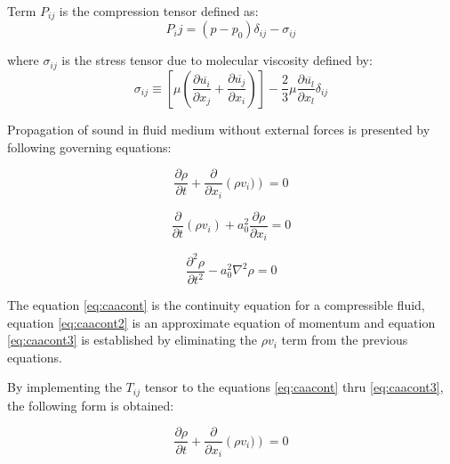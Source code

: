 Term $P_{ij}$ is the compression tensor defined as:
\begin{equation} \label{eq:Ptensor}
P_ij = (p - p_0)\delta_{ij} - \sigma_{ij}
\end{equation}

\noindent where $\sigma_{ij}$ is the stress tensor due to molecular viscosity defined by:
\begin{equation} \label{eq:viscstress}
\sigma_{ij}
\equiv
\left[ \mu \left( \frac{\partial \overline{u_i}}{\partial x_{j}} + \frac{\partial \overline{u_j}}{\partial x_{i}} \right) \right]
- \frac{2}{3} \mu \frac{\partial \overline{u_l}}{\partial x_l} \delta_{ij}
\end{equation}

Propagation of sound in fluid medium without external forces is presented by following governing equations:

\begin{equation} \label{eq:caacont}
\frac{\partial \rho}{\partial t} + \frac{\partial}{\partial x_i} \left( \rho v_i) \right) = 0
\end{equation}

\begin{equation} \label{eq:caacont2}
\frac{\partial}{\partial t} \left(\rho v_i \right) + a_0^2\frac{\partial \rho}{\partial x_i} = 0
\end{equation}

\begin{equation} \label{eq:caacont3}
\frac{\partial^2 \rho}{\partial t^2} - a_0^2 \nabla^2 \rho = 0
\end{equation}

The equation \ref{eq:caacont} is the continuity equation for a compressible fluid, equation \ref{eq:caacont2} is an approximate equation of momentum and equation \ref{eq:caacont3} is established by eliminating the $\rho v_i$ term from the previous equations.

%
By implementing the $T_{ij}$ tensor to the equations \ref{eq:caacont} thru \ref{eq:caacont3}, the following form is obtained: 

\begin{equation} \label{eq:caacont4}
\frac{\partial \rho}{\partial t} + \frac{\partial}{\partial x_i} \left( \rho v_i) \right) = 0
\end{equation}

